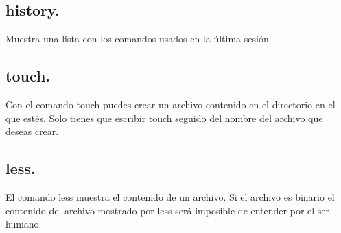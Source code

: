 \documentclass[letterpaper, 12pt, oneside]{article}%
\begin{document}
	\subsection{history.}
	{Muestra una lista con los comandos usados en la última sesión.}
	\subsection{touch.}
	{Con el comando touch puedes crear un archivo contenido en el directorio en el que estés. Solo tienes que escribir touch seguido del nombre del archivo que deseas crear.}
	\subsection{less.}
	{El comando less muestra el contenido de un archivo. Si el archivo es binario el contenido del archivo mostrado por less será imposible de entender por el ser humano.}
	
	
	
\end{document}
